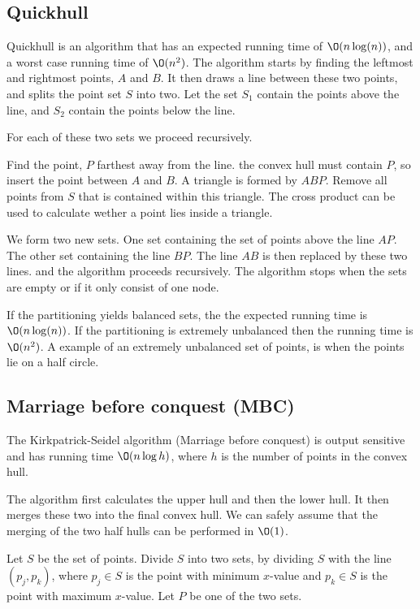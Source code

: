 \documentclass[10pt]{article}
\begin{document}
\subsection{Quickhull} %
\label{sub:quickhull}
Quickhull is an algorithm that has an expected running time of $\O(n\log(n))$, and a worst case running time of $\O(n^2)$. The algorithm starts by finding the leftmost and rightmost points, $A$ and $B$. It then draws a line between these two points, and splits the point set $S$ into two. Let the set $S_1$ contain the points above the line, and $S_2$ contain the points below the line. 

For each of these two sets we proceed recursively.

Find the point, $P$ farthest away from the line. the convex hull must contain $P$, so insert the point between $A$ and $B$. A triangle is formed by $ABP$. Remove all points from $S$ that is contained within this triangle. The cross product can be used to calculate wether a point lies inside a triangle.                                                                                        

We form two new sets. One set containing the set of points above the line $AP$. The other set containing the line $BP$. The line $AB$ is then replaced by these two lines. and the algorithm proceeds recursively. The algorithm stops when the sets are empty or if it only consist of one node.

If the partitioning yields balanced sets, the the expected running time is $\O(n\log(n))$. If the partitioning is extremely unbalanced then the running time is $\O(n^2)$. A example of an extremely unbalanced set of points, is when the points lie on a half circle.


\subsection{Marriage before conquest (MBC)} %
\label{sub:marriage_before_conquest_mbc_}
The Kirkpatrick-Seidel algorithm (Marriage before conquest) is output sensitive and has running time $\O(n\log{h})$, where $h$ is the number of points in the convex hull.

The algorithm first calculates the upper hull and then the lower hull. It then merges these two into the final convex hull. We can safely assume that the merging of the two half hulls can be performed in $\O(1)$.

Let $S$ be the set of points. Divide $S$ into two sets, by dividing $S$ with the line $(p_j,p_k)$, where $p_j \in S$ is the point with minimum $x$-value and $p_k \in S$ is the point with maximum $x$-value. Let $P$ be one of the two sets.
\end{document}
